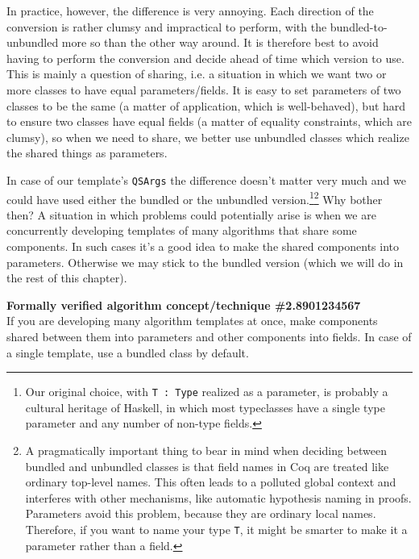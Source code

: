 \documentclass[declaration,mgr,english,shortabstract]{iithesis}
\newcommand{\m}[1]{\texttt{#1}}
\begin{document}
In practice, however, the difference is very annoying. Each direction of the conversion is rather clumsy and impractical to perform, with the bundled-to-unbundled more so than the other way around. It is therefore best to avoid having to perform the conversion and decide ahead of time which version to use. This is mainly a question of sharing, i.e. a situation in which we want two or more classes to have equal parameters/fields. It is easy to set parameters of two classes to be the same (a matter of application, which is well-behaved), but hard to ensure two classes have equal fields (a matter of equality constraints, which are clumsy), so when we need to share, we better use unbundled classes which realize the shared things as parameters.

In case of our template's \m{QSArgs} the difference doesn't matter very much and we could have used either the bundled or the unbundled version.\footnote{Our original choice, with \m{T\ :\ Type} realized as a parameter, is probably a cultural heritage of Haskell, in which most typeclasses have a single type parameter and any number of non-type fields.}\footnote{A pragmatically important thing to bear in mind when deciding between bundled and unbundled classes is that field names in Coq are treated like ordinary top-level names. This often leads to a polluted global context and interferes with other mechanisms, like automatic hypothesis naming in proofs. Parameters avoid this problem, because they are ordinary local names. Therefore, if you want to name your type \m{T}, it might be smarter to make it a parameter rather than a field.} Why bother then? A situation in which problems could potentially arise is when we are concurrently developing templates of many algorithms that share some components. In such cases it's a good idea to make the shared components into parameters. Otherwise we may stick to the bundled version (which we will do in the rest of this chapter).

\begin{center}
    \textbf{Formally verified algorithm concept/technique \#2.8901234567} \\
    If you are developing many algorithm templates at once, make components shared between them into parameters and other components into fields. In case of a single template, use a bundled class by default.
\end{center}

\end{document}
